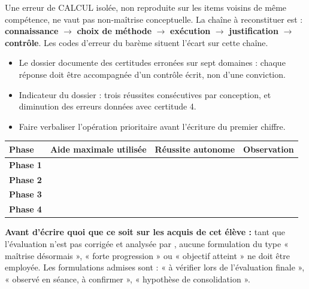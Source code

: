 \documentclass[10pt,a4paper]{article}
\begin{document}
Une erreur de \textsc{CALCUL} isolée, non reproduite sur les items voisins de même compétence, ne vaut pas non-maîtrise conceptuelle. La chaîne à reconstituer est : \textbf{connaissance} $\rightarrow$ \textbf{choix de méthode} $\rightarrow$ \textbf{exécution} $\rightarrow$ \textbf{justification} $\rightarrow$ \textbf{contrôle}. Les codes d'erreur du barème situent l'écart sur cette chaîne.
\begin{itemize}\item Le dossier documente des certitudes erronées sur sept domaines : chaque réponse doit être accompagnée d'un contrôle écrit, non d'une conviction.\item Indicateur du dossier : trois réussites consécutives par conception, et diminution des erreurs données avec certitude 4.\item Faire verbaliser l'opération prioritaire avant l'écriture du premier chiffre.\end{itemize}
\par\noindent\begin{tabularx}{\linewidth}{>{\bfseries}p{26mm} X X X}
\toprule Phase & Aide maximale utilisée & Réussite autonome & Observation \\ \midrule
Phase 1 & & & \\[6mm]
Phase 2 & & & \\[6mm]
Phase 3 & & & \\[6mm]
Phase 4 & & & \\[6mm]
\bottomrule\end{tabularx}
\begin{warningbox}\textbf{Avant d'écrire quoi que ce soit sur les acquis de cet élève :} tant que l'évaluation n'est pas corrigée et analysée par , aucune formulation du type « maîtrise désormais », « forte progression » ou « objectif atteint » ne doit être employée. Les formulations admises sont : « à vérifier lors de l'évaluation finale », « observé en séance, à confirmer », « hypothèse de consolidation ».\end{warningbox}
\end{document}

